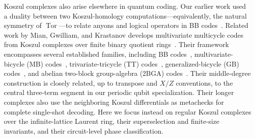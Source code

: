 \documentclass[aps,prx,english,superscriptaddress,twocolumn,tightenlines,showpacs,longbibliography,floatfix,amsfonts]{revtex4-2}
\theoremstyle{remark}
\theoremstyle{definition}
\begin{document}
	Koszul complexes also arise elsewhere in quantum coding. Our earlier work
	used a duality between two Koszul-homology
	computations---equivalently, the natural symmetry of
	\(\operatorname{Tor}\)---to relate anyons and logical operators in BB
	codes~\cite{Chen2025PRL}. Related work by Mian, Gwilliam, and Krastanov
	develops multivariate multicycle codes from Koszul complexes over finite
	binary quotient rings~\cite{Mian2026Multivariate}. Their framework
	encompasses several established families, including BB
	codes~\cite{Bravyi2024BB}, multivariate-bicycle (MB)
	codes~\cite{Voss2025MultivariateBicycle}, trivariate-tricycle (TT)
	codes~\cite{Jacob2025Tricycle,Menon2026MagicTricycles}, generalized-bicycle
	(GB) codes~\cite{KovalevPryadko2013}, and abelian two-block group-algebra
	(2BGA) codes~\cite{LinPryadko2024}. Their middle-degree
	construction is closely related, up to transpose and \(X/Z\) conventions, to
	the central three-term segment in our periodic qubit specialization. Their
	longer complexes also use the neighboring Koszul differentials as metachecks
	for complete single-shot decoding.
	Here we focus instead on regular Koszul complexes over the infinite-lattice
	Laurent ring, their
	superselection and finite-size invariants, and their circuit-level phase
	classification.
\end{document}
